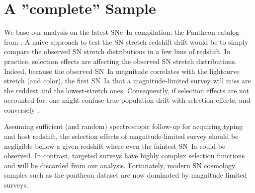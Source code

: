 \documentclass[]{aa} %
\newcommand{\nn}[1]{{\textcolor[rgb]{1, 0.27, 0}{#1}}}
\begin{document}

\section{A ''complete'' Sample}
\label{sec:sample}

We base our analysis on the latest SNe~Ia compilation: the Pantheon catalog from
\cite{scolnic2018a}. A naive approach to test the SN stretch redshift drift
would be to simply compare the observed SN stretch distributions in a few bins
of redshift.  In practice, selection effects are affecting the observed SN
stretch distributions. Indeed, because the observed SN~Ia magnitude correlates
with the lightcurve stretch (and color), the first SN~Ia that a
magnitude-limited survey will miss are the reddest and the lowest-stretch ones.
Consequently, if selection effects are not accounted for, one might confuse true
population drift with selection effects, and conversely \nn{\citep[e.g.,][]{kim19}}.

\nn{Assuming} sufficient (and random) spectroscopic follow-up for acquiring
typing and host redshift, the selection effects of magnitude-limited survey
should be negligible bellow a given redshift where even the faintest \nn{SN~Ia}
could be observed. In contrast, targeted surveys have highly complex selection
functions and will be discarded from our analysis. Fortunately, modern SN
cosmology samples such as the pantheon dataset are now dominated by magnitude
limited surveys.
\end{document}

